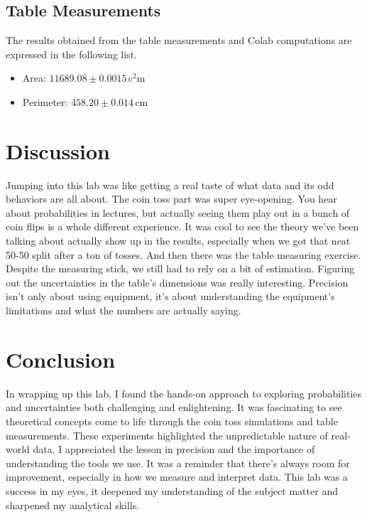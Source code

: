 \documentclass{report}
\begin{document}
    \bigbreak \noindent 
    \subsection{Table Measurements}
    \bigbreak \noindent 
    The results obtained from the table measurements and Colab computations are expressed in the following list. 
    \bigbreak \noindent 
    \begin{itemize}
        \item Area: $11689.08 \pm 0.0015\, \si{\square\centi\meter}$ 
        \item Perimeter: $458.20 \pm 0.014\, \si{\centi\meter}$
    \end{itemize}

    \bigbreak \noindent 
    \section{Discussion}
    \bigbreak \noindent 
    Jumping into this lab was like getting a real taste of what data and its odd behaviors are all about. The coin toss part was super eye-opening. You hear about probabilities in lectures, but actually seeing them play out in a bunch of coin flips is a whole different experience. It was cool to see the theory we've been talking about actually show up in the results, especially when we got that neat 50-50 split after a ton of tosses. 
    \bigbreak \noindent 
    And then there was the table measuring exercise. Despite the measuring stick, we still had to rely on a bit of estimation. Figuring out the uncertainties in the table's dimensions was really interesting. Precision isn't only about using equipment, it's about understanding the equipment's limitations and what the numbers are actually saying.


    \bigbreak \noindent 
    \section{Conclusion}
    \bigbreak \noindent 
    In wrapping up this lab, I found the hands-on approach to exploring probabilities and uncertainties both challenging and enlightening. It was fascinating to see theoretical concepts come to life through the coin toss simulations and table measurements. These experiments highlighted the unpredictable nature of real-world data.
    \bigbreak \noindent 
    I appreciated the lesson in precision and the importance of understanding the tools we use. It was a reminder that there's always room for improvement, especially in how we measure and interpret data. This lab was a success in my eyes, it deepened my understanding of the subject matter and sharpened my analytical skills. 










    
\end{document}
